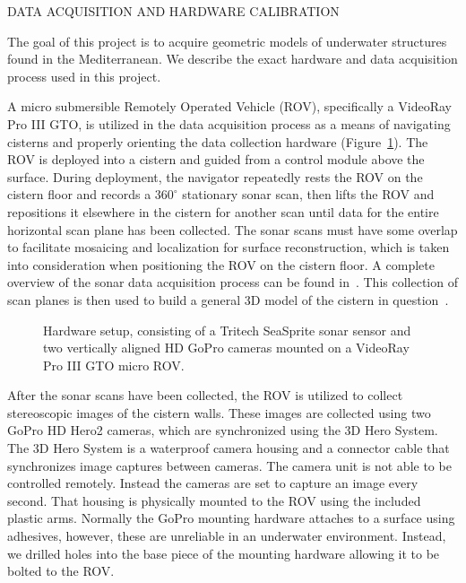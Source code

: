 \documentclass[twocolumn]{article}
\makeatletter
\def\section{\@startsection{section}{1}{\z@}{24pt plus 2 pt
minus 2 pt} {12pt plus 2pt minus 2pt}{\large\bf}}
\makeatother
\begin{document}
\section{\uppercase{Data Acquisition and Hardware Calibration}}
\label{sec:data}

\noindent The goal of this project is to acquire geometric models of underwater structures found in the Mediterranean.  We describe the exact hardware and data acquisition process used in this project.

A micro submersible Remotely Operated Vehicle (ROV), specifically a VideoRay Pro III GTO, is utilized in the data acquisition process as a means of navigating cisterns and properly orienting the data collection hardware (Figure~\ref{fig:ROV}). The ROV is deployed into a cistern and guided from a control module above the surface. During deployment, the navigator repeatedly rests the ROV on the cistern floor and records a $360^{\circ}$ stationary sonar scan, then lifts the ROV and repositions it elsewhere in the cistern for another scan until data for the entire horizontal scan plane has been collected. The sonar scans must have some overlap to facilitate mosaicing and localization for surface reconstruction, which is taken into consideration when positioning the ROV on the cistern floor. A complete overview of the sonar data acquisition process can be found in~\cite{ClarkVast}.  This collection of scan planes is then used to build a general 3D model of the cistern in question~\cite{ICEX11}.
  
\begin{figure}[!h]
   \vspace{-0.2cm}
   \caption{Hardware setup, consisting of a Tritech SeaSprite sonar sensor and two vertically aligned HD GoPro cameras mounted on a VideoRay Pro III GTO micro ROV.}
  \label{fig:ROV}
 \end{figure}

After the sonar scans have been collected, the ROV is utilized to collect stereoscopic images of the cistern walls.
These images are collected using two GoPro HD Hero2 cameras, which are synchronized using the 3D Hero System.  
The 3D Hero System is a waterproof camera housing and a connector cable that synchronizes image captures between cameras.
The camera unit is not able to be controlled remotely.  
Instead the cameras are set to capture an image every second.
That housing is physically mounted to the ROV using the included plastic arms. 
Normally the GoPro mounting hardware attaches to a surface using adhesives, however, these are unreliable in an underwater environment.  
Instead, we drilled holes into the base piece of the mounting hardware allowing it to be bolted to the ROV.    
\end{document}
